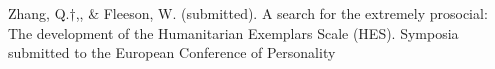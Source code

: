 

\item Zhang, Q.$\dagger$,\meb, \&  Fleeson, W. (submitted). A search for the extremely prosocial: The development of the Humanitarian Exemplars Scale (HES). Symposia submitted to the European Conference of Personality %



%
%

%

%

%

%
